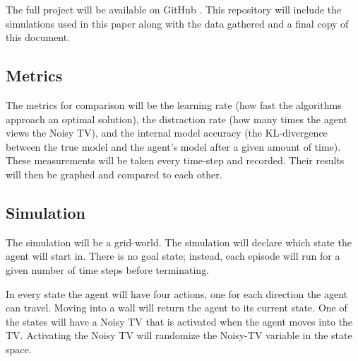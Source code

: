 \documentclass[12pt]{thesis}
\begin{document}
The full project will be available on GitHub \cite{TPIG:github}. This repository will include the simulations used in this paper along with the data gathered and a final copy of this document.

\subsection{Metrics}
The metrics for comparison will be the learning rate (how fast the algorithms approach an optimal solution), the distraction rate (how many times the agent views the Noisy TV), and the internal model accuracy (the KL-divergence between the true model and the agent's model after a given amount of time). These measurements will be taken every time-step and recorded. Their results will then be graphed and compared to each other.


\subsection{Simulation}
The simulation will be a grid-world. The simulation will declare which state the agent will start in. There is no goal state; instead, each episode will run for a given number of time steps before terminating.

In every state the agent will have four actions, one for each direction the agent can travel. Moving into a wall will return the agent to its current state. One of the states will have a Noisy TV that is activated when the agent moves into the TV. Activating the Noisy TV will randomize the Noisy-TV variable in the state space.
\end{document}
